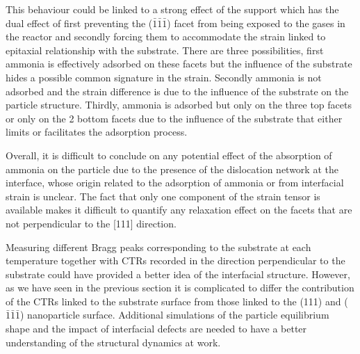 {This behaviour could be linked to a strong effect of the support which has the dual effect of first preventing the ($\bar{1}\bar{1}\bar{1}$) facet from being exposed to the gases in the reactor and secondly forcing them to accommodate the strain linked to epitaxial relationship with the substrate.
There are three possibilities, first ammonia is effectively adsorbed on these facets but the influence of the substrate hides a possible common signature in the strain.
Secondly ammonia is not adsorbed and the strain difference is due to the influence of the substrate on the particle structure.
Thirdly, ammonia is adsorbed but only on the three top facets or only on the 2 bottom facets due to the influence of the substrate that either limits or facilitates the adsorption process.



Overall, it is difficult to conclude on any potential effect of the absorption of ammonia on the particle due to the presence of the dislocation network at the interface, whose origin related to the adsorption of ammonia or from interfacial strain is unclear.
The fact that only one component of the strain tensor is available makes it difficult to quantify any relaxation effect on the facets that are not perpendicular to the [111] direction.

Measuring different Bragg peaks corresponding to the substrate at each temperature together with CTRs recorded in the direction perpendicular to the substrate could have provided a better idea of the interfacial structure.
However, as we have seen in the previous section it is complicated to differ the contribution of the CTRs linked to the substrate surface from those linked to the (111) and ($\bar{1}\bar{1}\bar{1}$) nanoparticle surface.
Additional simulations of the particle equilibrium shape and the impact of interfacial defects are needed to have a better understanding of the structural dynamics at work.

}
